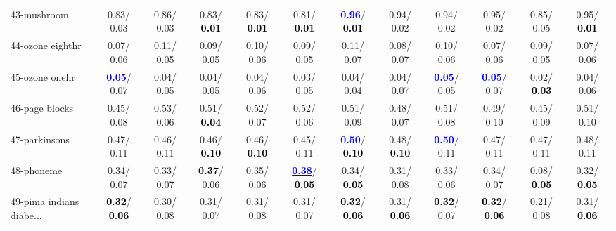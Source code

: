 \begin{table}[h]
\begin{center}
{\begin{tabular}{lc|c|c|c|c|c|c|c|c|c|c}
43-mushroom &   0.83/  0.03 &   0.86/  0.03 &   0.83/\textcolor{black}{\textbf{  0.01}} &   0.83/\textcolor{black}{\textbf{  0.01}} &   0.81/\textcolor{black}{\textbf{  0.01}} & \textcolor{blue}{\textbf{  0.96}}/\textcolor{black}{\textbf{  0.01}} &   0.94/  0.02 &   0.94/  0.02 &   0.95/  0.02 &   0.85/  0.05 &   0.95/\textcolor{black}{\textbf{  0.01}} \\
44-ozone eighthr &   0.07/  0.06 &   0.11/  0.05 &   0.09/  0.05 &   0.10/  0.06 &   0.09/  0.05 &   0.11/  0.07 &   0.08/  0.07 &   0.10/  0.06 &   0.07/  0.06 &   0.09/  0.05 &   0.07/  0.06 \\
45-ozone onehr & \textcolor{blue}{\textbf{  0.05}}/  0.07 &   0.04/  0.05 &   0.04/  0.05 &   0.04/  0.06 &   0.03/  0.05 &   0.04/  0.04 &   0.04/  0.07 & \textcolor{blue}{\textbf{  0.05}}/  0.05 & \textcolor{blue}{\textbf{  0.05}}/  0.07 &   0.02/\textcolor{black}{\textbf{  0.03}} &   0.04/  0.06 \\
46-page blocks &   0.45/  0.08 &   0.53/  0.06 &   0.51/\textcolor{black}{\textbf{  0.04}} &   0.52/  0.07 &   0.52/  0.06 &   0.51/  0.09 &   0.48/  0.07 &   0.51/  0.08 &   0.49/  0.10 &   0.45/  0.09 &   0.51/  0.10 \\ \hline
47-parkinsons &   0.47/  0.11 &   0.46/  0.11 &   0.46/\textcolor{black}{\textbf{  0.10}} &   0.46/\textcolor{black}{\textbf{  0.10}} &   0.45/  0.11 & \textcolor{blue}{\textbf{  0.50}}/\textcolor{black}{\textbf{  0.10}} &   0.48/\textcolor{black}{\textbf{  0.10}} & \textcolor{blue}{\textbf{  0.50}}/  0.11 &   0.47/  0.11 &   0.47/  0.11 &   0.48/  0.11 \\
48-phoneme &   0.34/  0.07 &   0.33/  0.07 & \textcolor{black}{\textbf{  0.37}}/  0.06 &   0.35/  0.06 & \underline{\textcolor{blue}{\textbf{  0.38}}}/\textcolor{black}{\textbf{  0.05}} &   0.34/\textcolor{black}{\textbf{  0.05}} &   0.31/  0.08 &   0.33/  0.06 &   0.34/  0.07 &   0.08/\textcolor{black}{\textbf{  0.05}} &   0.32/\textcolor{black}{\textbf{  0.05}} \\
49-pima indians diabe... & \textcolor{black}{\textbf{  0.32}}/\textcolor{black}{\textbf{  0.06}} &   0.30/  0.08 &   0.31/  0.07 &   0.31/  0.08 &   0.31/  0.07 & \textcolor{black}{\textbf{  0.32}}/\textcolor{black}{\textbf{  0.06}} &   0.31/\textcolor{black}{\textbf{  0.06}} & \textcolor{black}{\textbf{  0.32}}/  0.07 & \textcolor{black}{\textbf{  0.32}}/\textcolor{black}{\textbf{  0.06}} &   0.21/  0.08 &   0.31/\textcolor{black}{\textbf{  0.06}} \\

\end{tabular}}
\end{center}
\end{table}
